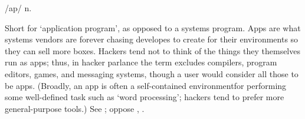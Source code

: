  /ap/ n.

Short for `application program', as opposed to a systems program. Apps are what systems vendors are forever chasing developes to create for
their environments so they can sell more boxes. Hackers tend not to think of the things they themselves run as apps; thus, in hacker
parlance the term excludes compilers, program editors, games, and messaging systems, though a user would consider all those to be apps.
(Broadly, an app is often a self-contained environmentfor performing some well-defined task such as `word processing'; hackers tend to
prefer more general-purpose tools.) See ; oppose , .

